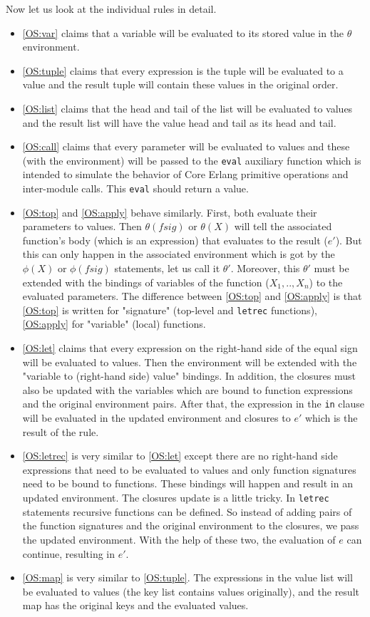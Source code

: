 \documentclass[12pt]{article}
\theoremstyle{definition}
\numberwithin{equation}{section}
\begin{document}
Now let us look at the individual rules in detail. 
\begin{itemize}
	\item \ref{OS:var} claims that a variable will be evaluated to its stored value in the $\theta$ environment.
	\item \ref{OS:tuple} claims that every expression is the tuple will be evaluated to a value and the result tuple will contain these values in the original order.
	\item \ref{OS:list} claims that the head and tail of the list will be evaluated to values and the result list will have the value head and tail as its head and tail.
	\item \ref{OS:call} claims that every parameter will be evaluated to values and these (with the environment) will be passed to the \verb|eval| auxiliary function which is intended to simulate the behavior of Core Erlang primitive operations and inter-module calls. This \verb|eval| should return a value.
	\item \ref{OS:top} and \ref{OS:apply} behave similarly. First, both evaluate their parameters to values. Then $\theta(fsig)$ or $\theta(X)$ will tell the associated function's body (which is an expression) that evaluates to the result ($e'$). But this can only happen in the associated environment which is got by the $\phi(X)$ or $\phi(fsig)$ statements, let us call it $\theta'$. Moreover, this $\theta'$ must be extended with the bindings of variables of the function ($X_1, .., X_n$) to the evaluated parameters. The difference between \ref{OS:top} and \ref{OS:apply} is that \ref{OS:top} is written for "signature" (top-level and \verb|letrec| functions), \ref{OS:apply} for "variable" (local) functions.
	\item \ref{OS:let} claims that every expression on the right-hand side of the equal sign will be evaluated to values. Then the environment will be extended with the "variable to (right-hand side) value" bindings. In addition, the closures must also be updated with the variables which are bound to function expressions and the original environment pairs. After that, the expression in the \verb|in| clause will be evaluated in the updated environment and closures to $e'$ which is the result of the rule.
	\item \ref{OS:letrec} is very similar to \ref{OS:let} except there are no right-hand side expressions that need to be evaluated to values and only function signatures need to be bound to functions. These bindings will happen and result in an updated environment. The closures update is a little tricky. In \verb|letrec| statements recursive functions can be defined. So instead of adding pairs of the function signatures and the original environment to the closures, we pass the updated environment. With the help of these two, the evaluation of $e$ can continue, resulting in $e'$.
	\item \ref{OS:map} is very similar to \ref{OS:tuple}. The expressions in the value list will be evaluated to values (the key list contains values originally), and the result map has the original keys and the evaluated values.
\end{itemize}
\end{document}
